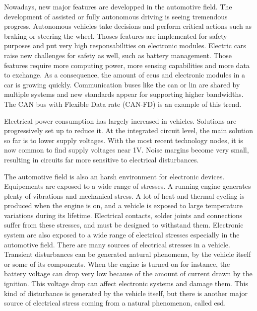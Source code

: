 Nowadays, new major features are developped in the automotive field.
The development of assisted or fully autonomous driving is seeing tremendous progress.
Autonomous vehicles take decisions and perform critical actions such as braking or steering the wheel.
Thoses features are implemented for safety purposes and put very high responsabilities on electronic modules.
Electric cars raise new challenges for safety as well, such as battery management.
Those features require more computing power, more sensing capabilities and more data to exchange.
As a consequence, the amount of \gls{ecu}s and electronic modules in a car is growing quickly.
Communication buses like the \gls{can} \cite{CAN} or \gls{lin} \cite{LIN} are shared by multiple systems and new standards appear for supporting higher bandwidths.
The CAN bus with Flexible Data rate (CAN-FD) is an example of this trend.

Electrical power consumption has largely increased in vehicles.
Solutions are progressively set up to reduce it.
At the integrated circuit level, the main solution so far is to lower supply voltages.
With the most recent technology nodes, it is now common to find supply voltages near 1V.
Noise margins become very small, resulting in circuits far more sensitive to electrical disturbances.

The automotive field is also an harsh environment for electronic devices.
Equipements are exposed to a wide range of stresses.
A running engine generates plenty of vibrations and mechanical stress.
A lot of heat and thermal cycling is produced when the engine is on, and a vehicle is exposed to large temperature variations during its lifetime.
Electrical contacts, solder joints and connections suffer from these stresses, and must be designed to withstand them.
Electronic system are also exposed to a wide range of electrical stresses especially in the automotive field.
There are many sources of electrical stresses in a vehicle.
Transient disturbances can be generated natural phenomena, by the vehicle itself or some of its components.
When the engine is turned on for instance, the battery voltage can drop very low because of the amount of current drawn by the ignition.
This voltage drop can affect electronic systems and damage them.
This kind of disturbance is generated by the vehicle itself, but there is another major source of electrical stress coming from a natural phenomenon, called \gls{esd}.

